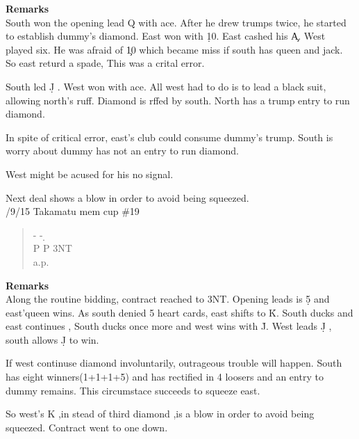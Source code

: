 {\bf Remarks}\\

South won the opening lead \s Q with ace. After he
drew trumps twice, he started to establish dummy's
diamond. East won with \d 10. East cashed his \c A.
West played six. He was afraid of  
 \c 10 which became miss if south
has queen and jack. So east returd a spade, This was a
crital error.

South led \d J . West won with ace.
All west had to do is to lead a black suit,
allowing north's ruff. Diamond is rffed by south.
North has a trump entry to run diamond.

In spite of critical error, east's club could consume
dummy's trump. South is worry about dummy has not 
an entry to run diamond.

West might be acused for his no signal.


Next deal shows a blow in order to avoid 
being squeezed.\\
/9/15 Takamatu mem cup \#19\\
\begin{quote}
%
  {}%
  {}
  {}%
  {}%
\end{quote}
\begin{quote}
\begin{bidding}
- \> -  \d {}\c  \\
P \s \> P \> 3NT\\
a.p.
\end{bidding}
\end{quote}


{\bf Remarks}\\


Along the routine bidding, contract reached to 3NT.
Opening leads is \d 5 and east'queen wins. As south denied 5 heart
cards, east shifts to \h K. South ducks and east continues , South
ducks once more and west wins with \h J. West leads \d J , south
allows \d J to win.

If west continuse diamond involuntarily, outrageous trouble will
happen. South has eight winners(1+1+1+5) and has rectified in 4 loosers
and an entry to dummy remains. This circumstace succeeds to squeeze east.

So west's \s K ,in stead of third diamond ,is a blow in order to avoid 
being squeezed. Contract went to one down.

